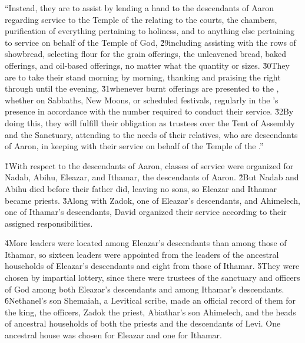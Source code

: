 \begin{poetry}
\poeml ``Instead, they are to assist by lending a hand to the descendants of Aaron regarding service to the Temple of the  relating to the courts, the chambers, purification of everything pertaining to holiness, and to anything else pertaining to service on behalf of the Temple of God, \v{29}including assisting with the rows of showbread, selecting flour for the grain offerings, the unleavened bread, baked offerings, and oil-based offerings, no matter what the quantity or sizes. \v{30}They are to take their stand morning by morning, thanking and praising the  right through until the evening, \v{31}whenever burnt offerings are presented to the , whether on Sabbaths, New Moons, or scheduled festivals, regularly in the 's presence in accordance with the number required to conduct their service. \v{32}By doing this, they will fulfill their obligation as trustees over the Tent of Assembly and the Sanctuary, attending to the needs of their relatives, who are descendants of Aaron, in keeping with their service on behalf of the Temple of the .''
\end{poetry}

\v{1}With respect to the descendants of Aaron, classes of service were organized for Nadab, Abihu, Eleazar, and Ithamar, the descendants of Aaron. \v{2}But Nadab and Abihu died before their father did, leaving no sons, so Eleazar and Ithamar became priests. \v{3}Along with Zadok, one of Eleazar's descendants, and Ahimelech, one of Ithamar's descendants, David organized their service according to their assigned responsibilities.

\v{4}More leaders were located among Eleazar's descendants than among those of Ithamar, so sixteen leaders were appointed from the leaders of the ancestral households of Eleazar's descendants and eight from those of Ithamar. \v{5}They were chosen by impartial lottery, since there were trustees of the sanctuary and officers of God among both Eleazar's descendants and among Ithamar's descendants. \v{6}Nethanel's son Shemaiah, a Levitical scribe, made an official record of them for the king, the officers, Zadok the priest, Abiathar's son Ahimelech, and the heads of ancestral households of both the priests and the descendants of Levi. One ancestral house was chosen for Eleazar and one for Ithamar.

